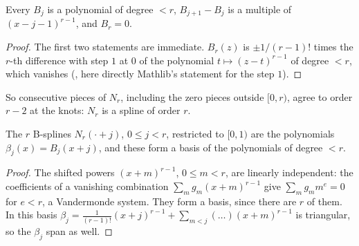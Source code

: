 \begin{lemma}
\label{lem:bspline-pieces}
\leanok
{}
Every $B_j$ is a polynomial of degree $< r$, $B_{j+1} - B_j$ is a multiple of $(x - j - 1)^{r-1}$, and
$B_r = 0$.
\end{lemma}

\begin{proof}
\leanok
The first two statements are immediate. $B_r(z)$ is $\pm 1/(r-1)!$ times the $r$-th difference
with step $1$ at $0$ of the polynomial $t \mapsto (z - t)^{r-1}$ of degree $< r$, which vanishes
(, here directly Mathlib's statement for the step $1$).
\end{proof}

So consecutive pieces of $N_r$, including the zero pieces outside $[0, r)$, agree to order $r - 2$
at the knots: $N_r$ is a spline of order $r$.

\begin{lemma}
\label{lem:bspline-basis}
\leanok
{}
The $r$ B-splines $N_r(\cdot + j)$, $0 \leq j < r$, restricted to $[0, 1)$ are the polynomials
$\beta_j(x) = B_j(x + j)$, and these form a basis of the polynomials of degree $< r$.
\end{lemma}

\begin{proof}
\leanok
The shifted powers $(x + m)^{r-1}$, $0 \leq m < r$, are linearly independent: the coefficients
of a vanishing combination $\sum_m g_m (x + m)^{r-1}$ give $\sum_m g_m m^e = 0$ for $e < r$, a
Vandermonde system. They form a basis, since there are $r$ of them. In this basis
$\beta_j = \frac{1}{(r-1)!} (x + j)^{r-1} + \sum_{m < j} (\ldots) (x + m)^{r-1}$ is triangular,
so the $\beta_j$ span as well.
\end{proof}

